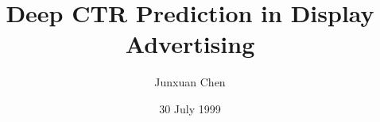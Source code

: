 \documentclass{sig-alternate}
\begin{document}
%

\title{Deep CTR Prediction in Display Advertising}
%
%
%
%
%

%
\author{
%
%
\alignauthor
Junxuan Chen%
}
\date{30 July 1999}
\end{document}
